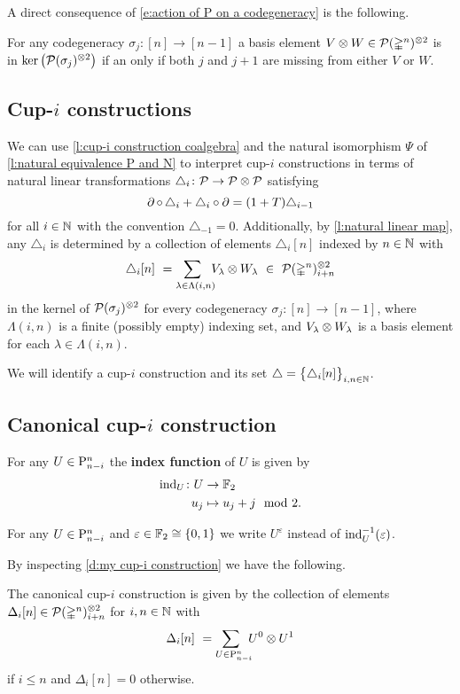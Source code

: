 A direct consequence of \cref{e:action of P on a codegeneracy} is the following.

\begin{lemma} \label{l:kernel of sxs}
	For any codegeneracy $\sigma_j \colon [n] \to [n-1]$ a basis element $V \otimes W \in \mathcal{P}(\mathbb{\Delta}^n)^{\otimes 2}$ is in $\ker \big( \mathcal{P}(\sigma_j)^{\otimes 2} \big)$ if an only if both $j$ and $j+1$ are missing from either $V$ or $W$.
\end{lemma}

\subsection{Cup-$i$ constructions}

We can use \cref{l:cup-i construction coalgebra} and the natural isomorphism $\Psi$ of \cref{l:natural equivalence P and N} to interpret \mbox{cup-$i$} constructions in terms of natural linear transformations $\triangle_i \colon \mathcal{P} \to \mathcal{P} \otimes \mathcal{P}$ satisfying
\[
\operatorname{\partial} \circ \, \triangle_i + \triangle_i \circ \operatorname{\partial} =
(1+T) \triangle_{i-1}
\]
for all $i \in \mathbb{N}$ with the convention $\triangle_{-1} = 0$.
Additionally, by \cref{l:natural linear map}, any $\triangle_i$ is determined by a collection of elements $\triangle_i [n]$ indexed by $n \in \mathbb{N}$ with
\[
\triangle_i [n] \ =
\sum_{\lambda \in \Lambda(i,n) \kern-5pt} V_\lambda \otimes W_\lambda \ \in \
\mathcal{P}(\mathbb{\Delta}^n)^{\otimes 2}_{i+n}
\]
in the kernel of $\mathcal{P}(\sigma_j)^{\otimes 2}$ for every codegeneracy $\sigma_j \colon [n] \to [n-1]$,
where $\Lambda(i,n)$ is a finite (possibly empty) indexing set, and $V_\lambda \otimes W_\lambda$ is a basis element for each $\lambda \in \Lambda(i,n)$.

We will identify a \mbox{cup-$i$} construction and its set $\triangle = \big\{ \triangle_i [n] \big\}_{i,n \in \mathbb{N}}$.

\subsection{Canonical \mbox{cup-$i$} construction}

\begin{definition}
	For any $U \in \mathrm{P}^n_{n-i}$ the \textbf{index function} of $U$ is given by
	\[
	\begin{split}
	\operatorname{ind}_U \colon U &\to {\mathbb{F}_2} \\
	u_j &\mapsto u_j + j \mod 2.
	\end{split}
	\]
\end{definition}

\begin{notation}
	For any $U \in \mathrm{P}^n_{n-i}$ and $\varepsilon \in {\mathbb{F}_2} \cong \{0,1\}$ we write $U^\varepsilon$ instead of $\operatorname{ind}_U^{-1}(\varepsilon)$.
\end{notation}

By inspecting \cref{d:my cup-i construction} we have the following.

\begin{lemma} \label{l:canonical cup-i construction}
	The canonical \mbox{cup-$i$} construction is given by the collection of elements $\Delta_i[n] \in \mathcal{P}(\mathbb{\Delta}^n)^{\otimes 2}_{i+n}$ for $i,n \in \mathbb{N}$ with
	\[
	\Delta_i[n] \ =
	\sum_{U \in \mathrm{P}^n_{n-i} \kern-5pt} U^0 \otimes U^1
	\]
	if $i \leq n$ and $\Delta_i[n] = 0$ otherwise.
\end{lemma}